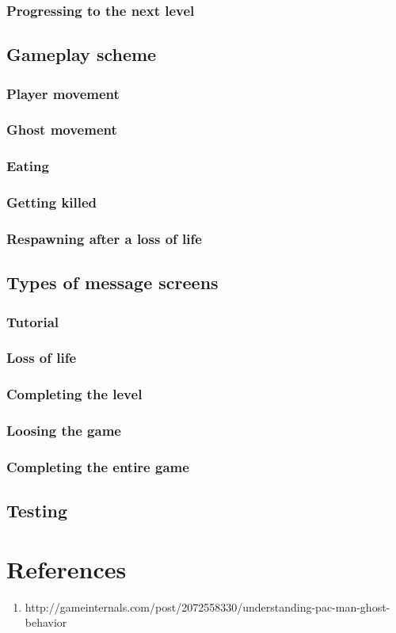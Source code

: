 \documentclass[11pt,a4paper]{report}
\begin{document}
			\subsection{Progressing to the next level}
		\section{Gameplay scheme}
			\subsection{Player movement}
			\subsection{Ghost movement}
			\subsection{Eating}
			\subsection{Getting killed}
			\subsection{Respawning after a loss of life}
		\section{Types of message screens}
			\subsection{Tutorial}
			\subsection{Loss of life}
			\subsection{Completing the level}
			\subsection{Loosing the game}
			\subsection{Completing the entire game}
		\section{Testing}
	\chapter{References}
		\begin{enumerate}
			\item
				http://gameinternals.com/post/2072558330/understanding-pac-man-ghost-behavior
				\label{stronaopacmanie}
		\end{enumerate}
			
\end{document}
